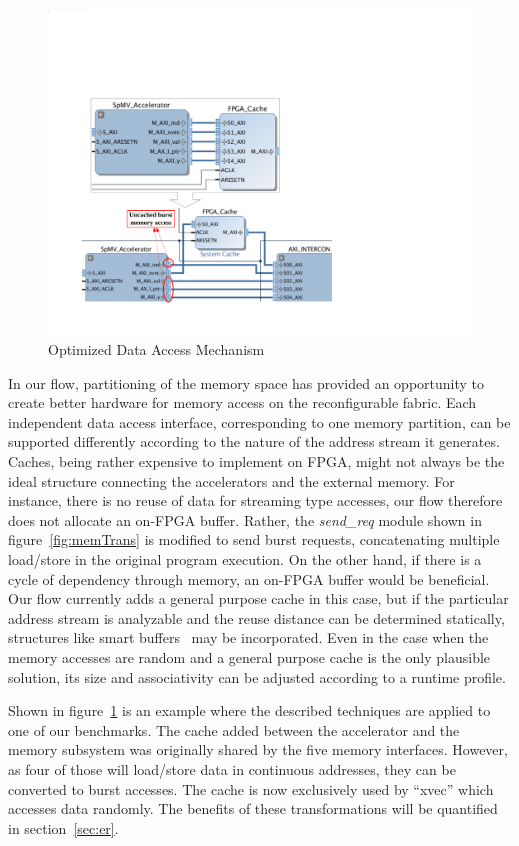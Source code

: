 \begin{figure}[htp]
\begin{center}
\includegraphics[width=0.65\linewidth]{chap3fig/memOptConv.pdf}
\caption{Optimized Data Access Mechanism
\label{fig:from2}}
\end{center}
\end{figure}



In our flow, partitioning of the memory space has provided
an opportunity to create better hardware for memory access
on the reconfigurable fabric. Each independent data access
interface, corresponding to one memory partition, can be
supported differently according to the nature of the address
stream it generates. 
Caches, being rather expensive to implement on FPGA, might not always be the
ideal structure connecting the accelerators and the external memory. 
For instance, there is no reuse of data for streaming type accesses, our flow therefore does not allocate
an on-FPGA buffer. Rather, the \textit{send\_req} module shown in
figure~\ref{fig:memTrans} is modified to send burst requests, concatenating
multiple load/store in the original program execution. On the
other hand, if there is a cycle of dependency through memory,
an on-FPGA buffer would be beneficial. Our flow currently
adds a general purpose cache in this case, but if the particular
address stream is analyzable and the reuse distance can be
determined statically, structures like smart buffers~\cite{Guo:2008} may
be incorporated. Even in the case when the memory accesses
are random and a general purpose cache is the only plausible
solution, its size and associativity can be adjusted according
to a runtime profile.


Shown in figure~\ref{fig:from2} is an example where the described techniques are applied to one of our benchmarks.
The cache added between the accelerator and the memory subsystem was originally shared by the five memory
interfaces. However,
as four of those will load/store data in continuous addresses, they can be converted to burst accesses.
The cache is now exclusively used by ``xvec'' which accesses data randomly. The benefits of these transformations
will be quantified in section~\ref{sec:er}.



